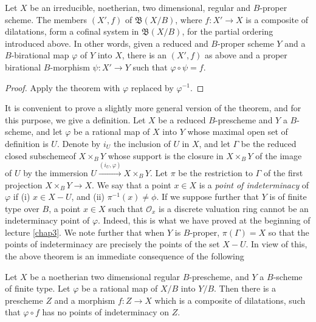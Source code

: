 \begin{coro*}
  Let $X$ be an irreducible, noetherian, two dimensional,
  regular and $B$-proper scheme. The members $(X',f)$ of $\mathfrak{B}(X/B)$,
  where $f:X' \to X$ is a composite of dilatations, form a cofinal
  system in  $\mathfrak{B} (X/B)$, for the partial ordering introduced
  above. In other words, given a reduced and $B$-proper scheme $Y$ and a
  $B$-birational map $\varphi$ of $Y$ into $X$, there is an $(X',f)$ as
  above and a proper birational $B$-morphism $\psi : X' \to Y$ such that
  $\varphi \circ \psi = f$. 
\end{coro*}

\begin{proof}
  Apply the theorem with $\varphi$ replaced by $\varphi^{-1}$.
\end{proof} 
 
It is convenient to prove a slightly more general version of the
theorem, and for this purpose, we give a definition. Let $X$ be a
reduced $B$-prescheme and $Y$ a $B$-scheme, and let $\varphi$ be a
rational map of $X$ into $Y$ whose maximal open set of definition is
$U$. Denote by $i_U$ the inclusion of $U$ in $X$, and let $\Gamma$ be
the reduced closed subscheme\pageoriginale of $X \times_B Y$ whose
support is the 
closure in  $X \times_B Y$ of the image of $U$ by the immersion $U
\xrightarrow{(i_U, \varphi)} X \times_B Y$. Let $\pi$ be the
restriction to $\Gamma$ of the first projection  $X \times_B Y \to
X$. We say that a point $x \in X$ is a \textit{point of
  indeterminacy} of $\varphi$ if (i) $x \in X-U$, and
(ii) $\pi^{-1}(x) \neq \phi$. If we suppose further that $Y$ is of
finite type over $B$, a point $x \in X$  such that $\mathscr{O}_x$ is
a discrete valuation ring cannot be an indeterminacy point of
$\varphi$. Indeed, this is what we have proved at the beginning of
lecture \ref{chap3}. We note further that when $Y$ is $B$-proper, $\pi (\Gamma)
= X$ so that the points of indeterminacy are precisely the points of
the set $X - U$. In view of this, the above theorem is an immediate
consequence of the following  

\begin{theorem*}
  Let $X$ be a noetherian two dimensional regular $B$-prescheme, and $Y$
  a $B$-scheme of finite type. Let $\varphi$ be a rational map of $X/B$
  into $Y/B$. Then there is a prescheme $Z$ and a morphism $f : Z \to
  X$ which is a composite of dilatations, such that $\varphi \circ f$ has no
  points of indeterminacy on $Z$.  
\end{theorem*} 

